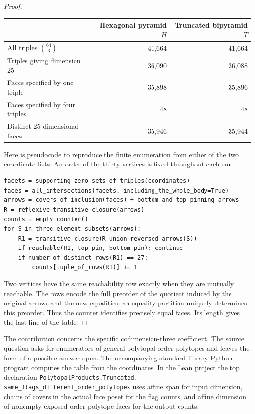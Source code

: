 \documentclass[11pt]{article}
\begin{document}
\begin{proof}
\begin{center}
\begin{tabular}{lrr}\hline
 & Hexagonal pyramid \(H\) & Truncated bipyramid \(T\)\\\hline
All triples \(\binom{64}{3}\) & 41,664 & 41,664\\
Triples giving dimension 25 & 36,090 & 36,088\\
Faces specified by one triple & 35,898 & 35,896\\
Faces specified by four triples & 48 & 48\\
Distinct 25-dimensional faces & 35,946 & 35,944\\\hline
\end{tabular}
\end{center}
Here is pseudocode to reproduce the finite enumeration from either
of the two coordinate lists. An order of the thirty vertices is
fixed throughout each run.
\begin{verbatim}
facets = supporting_zero_sets_of_triples(coordinates)
faces = all_intersections(facets, including_the_whole_body=True)
arrows = covers_of_inclusion(faces) + bottom_and_top_pinning_arrows
R = reflexive_transitive_closure(arrows)
counts = empty_counter()
for S in three_element_subsets(arrows):
    R1 = transitive_closure(R union reversed_arrows(S))
    if reachable(R1, top_pin, bottom_pin): continue
    if number_of_distinct_rows(R1) == 27:
        counts[tuple_of_rows(R1)] += 1
\end{verbatim}
Two vertices have the same reachability row exactly when they are
mutually reachable. The rows encode the full preorder of the
quotient induced by the original arrows and the new equalities:
an equality partition uniquely determines this preorder. Thus the
counter identifies precisely equal faces. Its length gives the
last line of the table.
\end{proof}

The contribution concerns the specific codimension-three coefficient.
The source question asks for enumerators of general polytopal
order polytopes and leaves the form of a possible answer open.
The accompanying standard-library Python program computes the table
from the coordinates. In the Lean project the top declaration
\texttt{PolytopalProducts.Truncated.}\\
\texttt{same\_flags\_different\_order\_polytopes}
uses affine span for input dimension, chains of covers in the
actual face poset for the flag counts, and affine dimension of
nonempty exposed order-polytope faces for the output counts.
\end{document}
